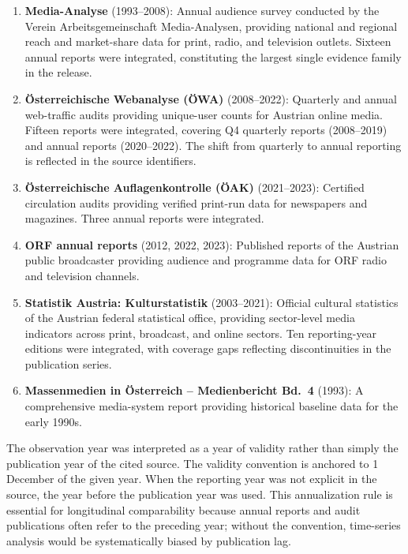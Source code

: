 \documentclass[11pt]{article}
\begin{document}
\begin{enumerate}
\item \textbf{Media-Analyse} (1993--2008): Annual audience survey conducted by the Verein Arbeitsgemeinschaft Media-Analysen, providing national and regional reach and market-share data for print, radio, and television outlets. Sixteen annual reports were integrated, constituting the largest single evidence family in the release.

\item \textbf{\"Osterreichische Webanalyse (\"OWA)} (2008--2022): Quarterly and annual web-traffic audits providing unique-user counts for Austrian online media. Fifteen reports were integrated, covering Q4 quarterly reports (2008--2019) and annual reports (2020--2022). The shift from quarterly to annual reporting is reflected in the source identifiers.

\item \textbf{\"Osterreichische Auflagenkontrolle (\"OAK)} (2021--2023): Certified circulation audits providing verified print-run data for newspapers and magazines. Three annual reports were integrated.

\item \textbf{ORF annual reports} (2012, 2022, 2023): Published reports of the Austrian public broadcaster providing audience and programme data for ORF radio and television channels.

\item \textbf{Statistik Austria: Kulturstatistik} (2003--2021): Official cultural statistics of the Austrian federal statistical office, providing sector-level media indicators across print, broadcast, and online sectors. Ten reporting-year editions were integrated, with coverage gaps reflecting discontinuities in the publication series.

\item \textbf{Massenmedien in \"Osterreich -- Medienbericht Bd.~4} (1993): A comprehensive media-system report providing historical baseline data for the early 1990s.
\end{enumerate}

The observation year was interpreted as a year of validity rather than simply the publication year of the cited source. The validity convention is anchored to 1 December of the given year. When the reporting year was not explicit in the source, the year before the publication year was used. This annualization rule is essential for longitudinal comparability because annual reports and audit publications often refer to the preceding year; without the convention, time-series analysis would be systematically biased by publication lag.
\end{document}
